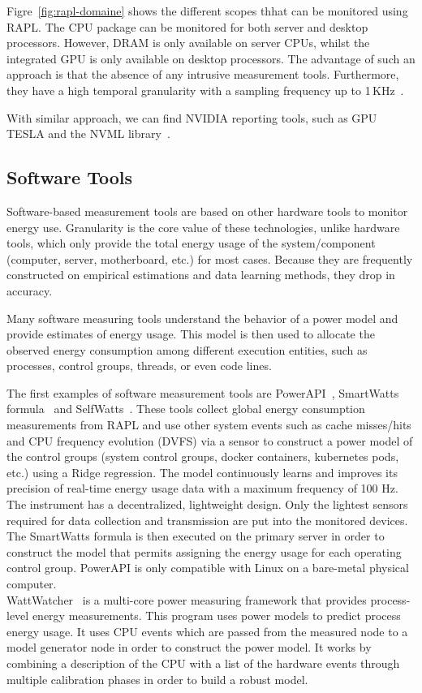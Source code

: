 Figre~\ref{fig:rapl-domaine} shows the different scopes  thhat can be monitored using RAPL.
The CPU package can be monitored for both server and desktop processors. However, DRAM is only available on server CPUs, whilst the integrated GPU is only available on desktop processors.
The advantage of such an approach is that the absence of any intrusive measurement tools.
Furthermore, they have a high temporal granularity with a sampling frequency up to 1\,KHz~\cite{ilsche_power_2015}.

With similar approach, we can find NVIDIA reporting tools, such as GPU TESLA \cite{burtscher2014measuring} and the NVML library~\cite{fahad2019comparative}.

\subsection{Software Tools}
Software-based measurement tools are based on other hardware tools to monitor energy use. Granularity is the core value of these technologies, unlike hardware tools, which only provide the total energy usage of the system/component (computer, server, motherboard, etc.) for most cases.
Because they are frequently constructed on empirical estimations and data learning methods, they drop in accuracy.

Many software measuring tools understand the behavior of a power model and provide estimates of energy usage.
This model is then used to allocate the observed energy consumption among different execution entities, such as processes, control groups, threads, or even code lines.

The first examples of software measurement tools are PowerAPI~\cite{colmant2018next}, SmartWatts formula~\cite{fieni2020smartwatts} and SelfWatts~\cite{fieni2021selfwatts}.
These tools collect global energy consumption measurements from RAPL and use other system events such as cache misses/hits and CPU frequency evolution (DVFS) via a sensor to construct a power model of the control groups (system control groups, docker containers, kubernetes pods, etc.) using a Ridge regression.
The model continuously learns and improves its precision of real-time energy usage data with a maximum frequency of 100 Hz.
The instrument has a decentralized, lightweight design.
Only the lightest sensors required for data collection and transmission are put into the monitored devices.
The SmartWatts formula is then executed on the primary server in order to construct the model that permits assigning the energy usage for each operating control group.
PowerAPI is only compatible with Linux on a bare-metal physical computer.
\\
WattWatcher~\cite{lebeane2015watt} is a multi-core power measuring framework that provides process-level energy measurements.
This program uses power models to predict process energy usage. It uses CPU events which are passed from the measured node to a model generator node in order to construct the power model. It works by combining a description of the CPU with a list of the hardware events through multiple calibration phases in order to build a robust model.


